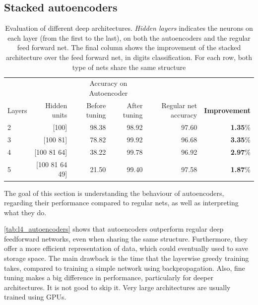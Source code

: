 \documentclass[a4paper, 10pt]{article}
\begin{document}
    \subsection{Stacked autoencoders}
    \begin{table}[h]
      \centering
      \begin{tabular}{@{}lrrrrr@{}}
        \toprule
        && \multicolumn {2}{c}{Accuracy on Autoencoder} \\
        \cmidrule{3-4} 
        Layers & Hidden units & Before tuning & After tuning & 
        Regular net accuracy & \textbf{Improvement} \\
        \midrule
        2   & [100]           &  98.38   &  98.92  &   97.60  &  \textbf{1.35}\% \\
        3   & [100 81]        &  78.82   &  99.92  &   96.68  &  \textbf{3.35}\% \\
        4   & [100 81 64]     &  38.22   &  99.78  &   96.92  &  \textbf{2.97}\% \\
        5   & [100 81 64 49]  &  21.50   &  99.40  &   97.58  &  \textbf{1.87}\% \\
        \bottomrule
      \end{tabular} 
      \caption{Evaluation of different deep architectures. \emph{Hidden layers} 
      indicates the neurons on each layer (from the first to the last), on both
      the autoencoders and the regular feed forward net. The final column shows
      the improvement of the stacked architecture over the feed forward net,
      in digits classification. For each row, both type of nets share the same
      structure}
      \label{tab:l4_autoencoders}
    \end{table}

    The goal of this section is understanding the behaviour of autoencoders, 
    regarding their performance compared to regular nets, as well as interpreting
    what they do. 

    \autoref{tab:l4_autoencoders} shows that autoencoders outperform regular deep
    feedforward networks, even when sharing the same structure. Furthermore, 
    they offer a more efficient representation of data, which could eventually
    used to save storage space. The main drawback is the time that
    the layerwise greedy training takes, compared to training a simple 
    network using backpropagation. Also, fine tuning makes a big difference in 
    performance, particularly for deeper architectures. It is not good to skip it.
    Very large architectures are usually trained using GPUs.
\end{document}
